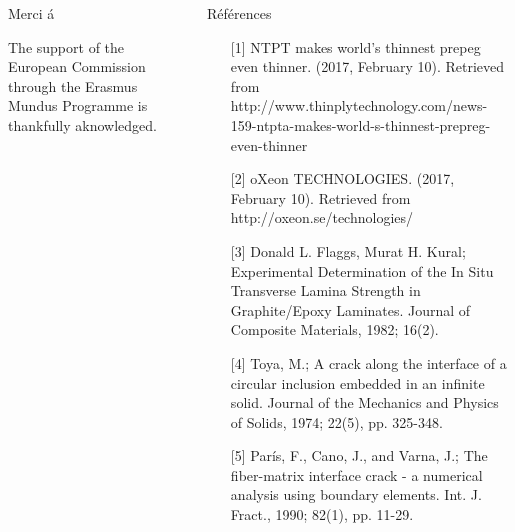 \documentclass[final]{beamer}
\begin{document}
\begin{frame}

\begin{center}
\begin{minipage}{\textwidth}
\begin{columns}[totalwidth=0.925\textwidth]
\begin{column}{0.45\textwidth}
\begin{block}{\rule[-0.6ex]{0pt}{50pt}\centering Merci \'a}
\centering\scriptsize The support of the European Commission through the Erasmus Mundus Programme is thankfully aknowledged.
\end{block}
\end{column}
\begin{column}{0.45\textwidth}
\begin{block}{\rule[-0.6ex]{0pt}{50pt}\centering R\'ef\'erences}
\centering
\tiny
\begin{enumerate}
\item[{[}1{]}] NTPT makes world's thinnest prepeg even thinner. (2017, February 10). Retrieved from http://www.thinplytechnology.com/news-159-ntpta-makes-world-s-thinnest-prepreg-even-thinner
\item[{[}2{]}] oXeon TECHNOLOGIES. (2017, February 10). Retrieved from http://oxeon.se/technologies/
\item[{[}3{]}] Donald L. Flaggs, Murat H. Kural; Experimental Determination of the In Situ Transverse Lamina Strength in Graphite/Epoxy Laminates.  Journal of Composite Materials, 1982; 16(2).
\item[{[}4{]}] Toya, M.; A crack along the interface of a circular inclusion embedded in an infinite solid. Journal of the Mechanics and Physics of Solids, 1974; 22(5), pp. 325-348.
\item[{[}5{]}] Par\'is, F., Cano, J., and Varna, J.; The fiber-matrix interface crack - a numerical analysis using boundary elements. Int. J. Fract., 1990; 82(1), pp. 11-29.
\end{enumerate}
\end{block}
\end{column}
\end{columns}
\end{minipage}
\end{center}

\end{frame}
\end{document}
